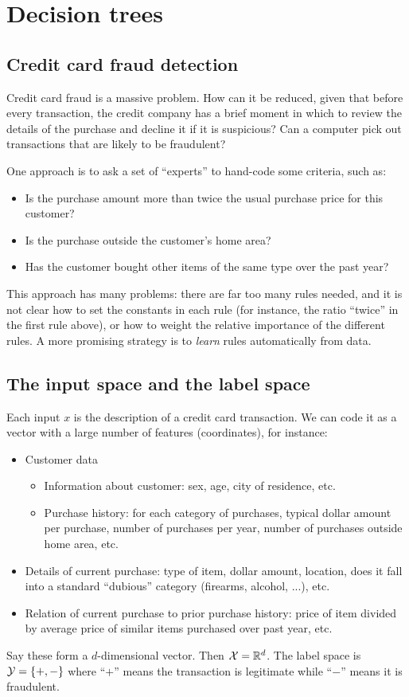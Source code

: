 \section{Decision trees}

\subsection{Credit card fraud detection}

Credit card fraud is a massive problem. How can it be reduced, given that before
every transaction, the credit company has a brief moment in which to review the
details of the purchase and decline it if it is suspicious? Can a computer pick
out transactions that are likely to be fraudulent?

One approach is to ask a set of ``experts'' to hand-code some criteria, such as:
\begin{itemize}
\item Is the purchase amount more than twice the usual purchase price for this customer?
\item Is the purchase outside the customer's home area?
\item Has the customer bought other items of the same type over the past year?
\end{itemize}
This approach has many problems: there are far too many rules needed, and it is not 
clear how to set the constants in each rule (for instance, the ratio ``twice'' in the
first rule above), or how to weight the relative importance of the different rules.
A more promising strategy is to {\it learn} rules automatically from data.

\subsection{The input space and the label space}

Each input $x$ is the description of a credit card transaction. We can code it as
a vector with a large number of features (coordinates), for instance:
\begin{itemize}
\item Customer data
\begin{itemize}
\item Information about customer: sex, age, city of residence, etc.
\item Purchase history: for each category of purchases, typical dollar amount per purchase, number of purchases per year, number of purchases outside home area, etc.
\end{itemize}
\item Details of current purchase: type of item, dollar amount, location, does it fall into a standard ``dubious'' category (firearms, alcohol, ...), etc.
\item Relation of current purchase to prior purchase history: price of item divided by average price of similar items purchased over past year, etc.
\end{itemize}
Say these form a $d$-dimensional vector. Then ${\cal X} = \mathbb{R}^d$.
The label space is ${\cal Y} = \{+,-\}$ where ``$+$'' means the transaction is legitimate 
while ``$-$'' means it is fraudulent.

